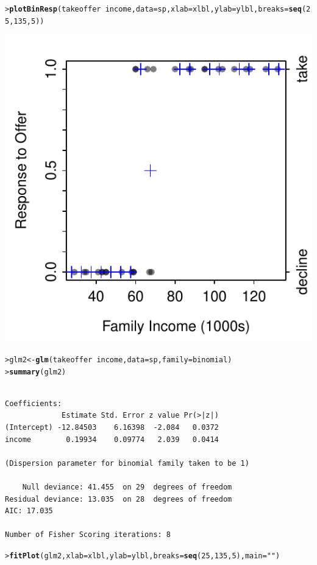 \documentclass{article}\usepackage[]{graphicx}\usepackage[]{color}
\makeatletter
\newcommand{\hlnum}[1]{\textcolor[rgb]{0.686,0.059,0.569}{#1}}%
\newcommand{\hlstr}[1]{\textcolor[rgb]{0.192,0.494,0.8}{#1}}%
\newcommand{\hlopt}[1]{\textcolor[rgb]{0,0,0}{#1}}%
\newcommand{\hlstd}[1]{\textcolor[rgb]{0.345,0.345,0.345}{#1}}%
\newcommand{\hlkwb}[1]{\textcolor[rgb]{0.69,0.353,0.396}{#1}}%
\newcommand{\hlkwc}[1]{\textcolor[rgb]{0.333,0.667,0.333}{#1}}%
\newcommand{\hlkwd}[1]{\textcolor[rgb]{0.737,0.353,0.396}{\textbf{#1}}}%
\newenvironment{kframe}{%
 \def\at@end@of@kframe{}%
 \ifinner\ifhmode%
  \def\at@end@of@kframe{\end{minipage}}%
  \begin{minipage}{\columnwidth}%
 \fi\fi%
 \def\FrameCommand##1{\hskip\@totalleftmargin \hskip-\fboxsep
 \colorbox{shadecolor}{##1}\hskip-\fboxsep
     \hskip-\linewidth \hskip-\@totalleftmargin \hskip\columnwidth}%
 \MakeFramed {\advance\hsize-\width
   \@totalleftmargin\z@ \linewidth\hsize
   \@setminipage}}%
 {\par\unskip\endMakeFramed%
 \at@end@of@kframe}
\newenvironment{knitrout}{}{} %
\makeatother
\begin{document}
\begin{knitrout}
\color{fgcolor}\begin{kframe}
\begin{alltt}
\hlstd{> }\hlkwd{plotBinResp}\hlstd{(takeoffer}\hlopt{~}\hlstd{income,}\hlkwc{data}\hlstd{=sp,}\hlkwc{xlab}\hlstd{=xlbl,}\hlkwc{ylab}\hlstd{=ylbl,}\hlkwc{breaks}\hlstd{=}\hlkwd{seq}\hlstd{(}\hlnum{25}\hlstd{,}\hlnum{135}\hlstd{,}\hlnum{5}\hlstd{))}
\end{alltt}
\end{kframe}

{\centering \includegraphics[width=.4\linewidth]{Figs/SolarLogPlot-1} 

}


\begin{kframe}\begin{alltt}
\hlstd{> }\hlstd{glm2} \hlkwb{<-} \hlkwd{glm}\hlstd{(takeoffer}\hlopt{~}\hlstd{income,}\hlkwc{data}\hlstd{=sp,}\hlkwc{family}\hlstd{=binomial)}
\hlstd{> }\hlkwd{summary}\hlstd{(glm2)}
\end{alltt}
\begin{verbatim}

Coefficients:
             Estimate Std. Error z value Pr(>|z|)
(Intercept) -12.84503    6.16398  -2.084   0.0372
income        0.19934    0.09774   2.039   0.0414

(Dispersion parameter for binomial family taken to be 1)

    Null deviance: 41.455  on 29  degrees of freedom
Residual deviance: 13.035  on 28  degrees of freedom
AIC: 17.035

Number of Fisher Scoring iterations: 8
\end{verbatim}
\begin{alltt}
\hlstd{> }\hlkwd{fitPlot}\hlstd{(glm2,}\hlkwc{xlab}\hlstd{=xlbl,}\hlkwc{ylab}\hlstd{=ylbl,}\hlkwc{breaks}\hlstd{=}\hlkwd{seq}\hlstd{(}\hlnum{25}\hlstd{,}\hlnum{135}\hlstd{,}\hlnum{5}\hlstd{),}\hlkwc{main}\hlstd{=}\hlstr{""}\hlstd{)}
\end{alltt}
\end{kframe}


\end{knitrout}
\end{document}
